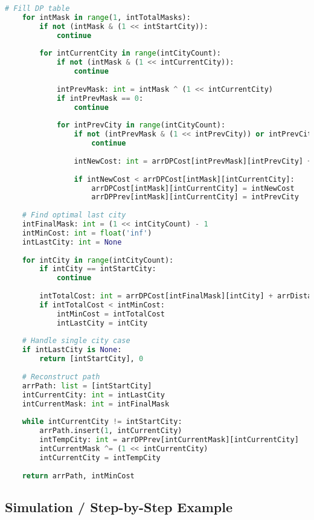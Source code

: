 \documentclass{article}
\begin{document}
\begin{lstlisting}[language=Python]
    # Fill DP table
    for intMask in range(1, intTotalMasks):
        if not (intMask & (1 << intStartCity)):
            continue
            
        for intCurrentCity in range(intCityCount):
            if not (intMask & (1 << intCurrentCity)):
                continue
                
            intPrevMask: int = intMask ^ (1 << intCurrentCity)
            if intPrevMask == 0:
                continue
                
            for intPrevCity in range(intCityCount):
                if not (intPrevMask & (1 << intPrevCity)) or intPrevCity == intCurrentCity:
                    continue
                    
                intNewCost: int = arrDPCost[intPrevMask][intPrevCity] + arrDistanceMatrix[intPrevCity][intCurrentCity]
                
                if intNewCost < arrDPCost[intMask][intCurrentCity]:
                    arrDPCost[intMask][intCurrentCity] = intNewCost
                    arrDPPrev[intMask][intCurrentCity] = intPrevCity
    
    # Find optimal last city
    intFinalMask: int = (1 << intCityCount) - 1
    intMinCost: int = float('inf')
    intLastCity: int = None
    
    for intCity in range(intCityCount):
        if intCity == intStartCity:
            continue
            
        intTotalCost: int = arrDPCost[intFinalMask][intCity] + arrDistanceMatrix[intCity][intStartCity]
        if intTotalCost < intMinCost:
            intMinCost = intTotalCost
            intLastCity = intCity
    
    # Handle single city case
    if intLastCity is None:
        return [intStartCity], 0
    
    # Reconstruct path
    arrPath: list = [intStartCity]
    intCurrentCity: int = intLastCity
    intCurrentMask: int = intFinalMask
    
    while intCurrentCity != intStartCity:
        arrPath.insert(1, intCurrentCity)
        intTempCity: int = arrDPPrev[intCurrentMask][intCurrentCity]
        intCurrentMask ^= (1 << intCurrentCity)
        intCurrentCity = intTempCity
    
    return arrPath, intMinCost
\end{lstlisting}

\subsection*{Simulation / Step-by-Step Example}
\end{document}
